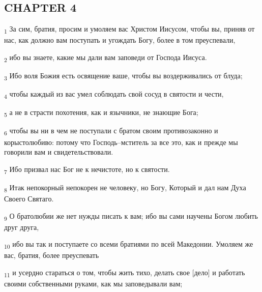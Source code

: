 \subsection{CHAPTER 4}
\begin{tcolorbox}
\textsubscript{1} За сим, братия, просим и умоляем вас Христом Иисусом, чтобы вы, приняв от нас, как должно вам поступать и угождать Богу, более в том преуспевали,
\end{tcolorbox}
\begin{tcolorbox}
\textsubscript{2} ибо вы знаете, какие мы дали вам заповеди от Господа Иисуса.
\end{tcolorbox}
\begin{tcolorbox}
\textsubscript{3} Ибо воля Божия есть освящение ваше, чтобы вы воздерживались от блуда;
\end{tcolorbox}
\begin{tcolorbox}
\textsubscript{4} чтобы каждый из вас умел соблюдать свой сосуд в святости и чести,
\end{tcolorbox}
\begin{tcolorbox}
\textsubscript{5} а не в страсти похотения, как и язычники, не знающие Бога;
\end{tcolorbox}
\begin{tcolorbox}
\textsubscript{6} чтобы вы ни в чем не поступали с братом своим противозаконно и корыстолюбиво: потому что Господь--мститель за все это, как и прежде мы говорили вам и свидетельствовали.
\end{tcolorbox}
\begin{tcolorbox}
\textsubscript{7} Ибо призвал нас Бог не к нечистоте, но к святости.
\end{tcolorbox}
\begin{tcolorbox}
\textsubscript{8} Итак непокорный непокорен не человеку, но Богу, Который и дал нам Духа Своего Святаго.
\end{tcolorbox}
\begin{tcolorbox}
\textsubscript{9} О братолюбии же нет нужды писать к вам; ибо вы сами научены Богом любить друг друга,
\end{tcolorbox}
\begin{tcolorbox}
\textsubscript{10} ибо вы так и поступаете со всеми братиями по всей Македонии. Умоляем же вас, братия, более преуспевать
\end{tcolorbox}
\begin{tcolorbox}
\textsubscript{11} и усердно стараться о том, чтобы жить тихо, делать свое [дело] и работать своими собственными руками, как мы заповедывали вам;
\end{tcolorbox}

